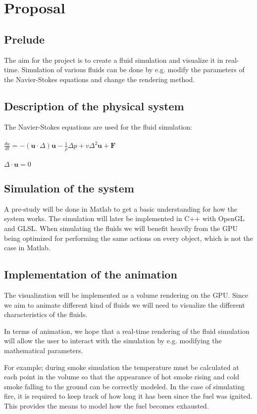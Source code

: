 \documentclass[a4paper,12pt,twoside,swedish]{report}
\begin{document}
\pagestyle{plain}

\setcounter{page}{1}

\chapter{Proposal}

\section{Prelude}
The aim for the project is to create a fluid simulation and visualize it in real-time. Simulation of various fluids can be done by e.g. modify the parameters of the Navier-Stokes equations and change the rendering method.

\section{Description of the physical system}
The Navier-Stokes equations are used for the fluid simulation:\\\\
\(\frac{du}{dt} = - (\textbf{u}\cdot{\Delta})\textbf{u} - \frac{1}{\rho}\Delta p + v \Delta^2 \textbf{u} + \textbf{F}\)\\\\
\(\Delta \cdot \textbf{u} = 0 \)
\section{Simulation of the system}
A pre-study will be done in Matlab to get a basic understanding for how the system works. The simulation will later be implemented in C++ with OpenGL and GLSL. When simulating the fluids we will benefit heavily from the GPU being optimized for performing the same actions on every object, which is not the case in Matlab.

\section{Implementation of the animation}
The visualization will be implemented as a volume rendering on the GPU. Since we aim to animate different kind of fluids we will need to visualize the different characteristics of the fluids.

In terms of animation, we hope that a real-time rendering of the fluid simulation will allow the user to interact with the simulation by e.g. modifying the mathematical parameters.

For example; during smoke simulation the temperature must be calculated at each point in the volume so that the appearance of hot smoke rising and cold smoke falling to the ground can be correctly modeled. In the case of simulating fire, it is required to keep track of how long it has been since the fuel was ignited. This provides the means to model how the fuel becomes exhausted.
\end{document}
